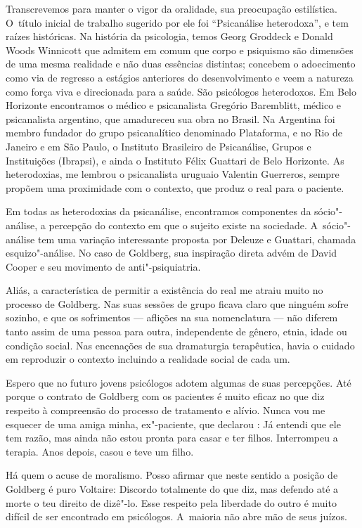Transcrevemos para manter o vigor da oralidade, sua preocupação
estilística. O~título inicial de trabalho sugerido por ele foi
``Psicanálise heterodoxa'', e tem raízes históricas. Na história da
psicologia, temos Georg Groddeck e Donald Woods Winnicott que admitem em
comum que corpo e psiquismo são dimensões de uma mesma realidade e não
duas essências distintas; concebem o adoecimento como via de regresso a
estágios anteriores do desenvolvimento e veem a natureza como força viva
e direcionada para a saúde. São psicólogos heterodoxos. Em Belo
Horizonte encontramos o médico e psicanalista Gregório Baremblitt,
médico e psicanalista argentino, que amadureceu sua obra no Brasil. Na
Argentina foi membro fundador do grupo psicanalítico denominado
Plataforma, e no Rio de Janeiro e em São Paulo, o Instituto Brasileiro
de Psicanálise, Grupos e Instituições (Ibrapsi), e ainda o Instituto
Félix Guattari de Belo Horizonte. As heterodoxias, me lembrou o
psicanalista uruguaio Valentin Guerreros, sempre propõem uma proximidade
com o contexto, que produz o real para o paciente.

Em todas as heterodoxias da psicanálise, encontramos componentes da
sócio"-análise, a percepção do contexto em que o sujeito existe na
sociedade. A~sócio"-análise tem uma variação interessante proposta por
Deleuze e Guattari, chamada esquizo"-análise. No caso de Goldberg, sua
inspiração direta advém de David Cooper e seu movimento de
anti"-psiquiatria.

Aliás, a característica de permitir a existência do real me atraiu muito
no processo de Goldberg. Nas suas sessões de grupo ficava claro que
ninguém sofre sozinho, e que os sofrimentos --- aflições na sua
nomenclatura --- não diferem tanto assim de uma pessoa para outra,
independente de gênero, etnia, idade ou condição social. Nas encenações
de sua dramaturgia terapêutica, havia o cuidado em reproduzir o contexto
incluindo a realidade social de cada um.

Espero que no futuro jovens psicólogos adotem algumas de suas
percepções. Até porque o contrato de Goldberg com os pacientes é muito
eficaz no que diz respeito à compreensão do processo de tratamento e
alívio. Nunca vou me esquecer de uma amiga minha, ex"-paciente, que
declarou : Já entendi que ele tem razão, mas ainda não estou pronta para
casar e ter filhos. Interrompeu a terapia. Anos depois, casou e teve um
filho.

Há quem o acuse de moralismo. Posso afirmar que neste sentido a posição
de Goldberg é puro Voltaire: Discordo totalmente do que diz, mas defendo
até a morte o teu direito de dizê"-lo. Esse respeito pela liberdade do
outro é muito difícil de ser encontrado em psicólogos. A~maioria não
abre mão de seus juízos.

